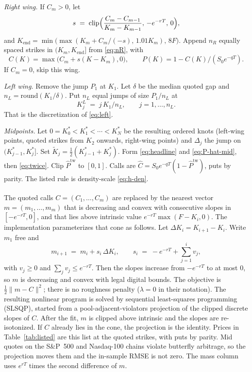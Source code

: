\documentclass[preprint,12pt,authoryear,times]{elsarticle}
\begin{document}
\textit{Right wing.} If \(C_m>0\), let
\[
s
\;=\;
\mathrm{clip}\Bigl(\frac{C_m-C_{m-1}}{K_m-K_{m-1}},\,-e^{-rT},\,0\Bigr),
\]
and \(K_{\mathrm{end}}=\min\bigl(\max(K_m+C_m/(-s),\,1.01 K_m),\,8F\bigr)\). Append \(n_R\) equally spaced strikes in \((K_m,K_{\mathrm{end}}]\) from \eqref{eq:nR}, with
\[
C(K)=\max\bigl(C_m+s(K-K_m),0\bigr),
\qquad
P(K)=1-C(K)/(S_0e^{-qT}).
\]
If \(C_m=0\), skip this wing.

\textit{Left wing.} Remove the jump \(P_1\) at \(K_1\). Let \(\delta\) be the median quoted gap and \(n_L=\mathrm{round}(K_1/\delta)\). Put \(n_L\) equal jumps of size \(P_1/n_L\) at
\[
K_j^{L}
\;=\;
j\,K_1/n_L,
\qquad
j=1,\ldots,n_L.
\]
That is the discretization of \eqref{eq:left}.

\textit{Midpoints.} Let \(0=K_0^{\ast}<K_1^{\ast}<\cdots<K_N^{\ast}\) be the resulting ordered knots (left-wing points, quoted strikes from \(K_2\) onwards, right-wing points) and \(\Delta_j\) the jump on \((K_{j-1}^{\ast},K_j^{\ast}]\). Set \(\tilde K_j=\tfrac12(K_{j-1}^{\ast}+K_j^{\ast})\). Form \eqref{eq:headline} and \eqref{eq:P-hat-mid}, then \eqref{eq:twice}. Clip \(\hat P^{\mathrm{tw}}\) to \([0,1]\). Calls are \(\hat C=S_0e^{-qT}(1-\hat P^{\mathrm{tw}})\), puts by parity. The listed rule is density-scale \eqref{eq:h-den}. 

\paragraph{\citeauthor{yatchew2006}}
The quoted calls \(C=(C_1,\ldots,C_m)\) are replaced by the nearest vector \(m=(m_1,\ldots,m_m)\) that is decreasing and convex with consecutive slopes in \([-e^{-rT},0]\), and that lies above intrinsic value \(e^{-rT}\max(F-K_i,0)\). The implementation parameterizes that cone as follows. Let \(\Delta K_i=K_{i+1}-K_i\). Write \(m_1\) free and
\[
m_{i+1}
\;=\;
m_i+s_i\,\Delta K_i,
\qquad
s_i
\;=\;
-e^{-rT}+\sum_{j=1}^{i}v_j,
\]
with \(v_j\ge 0\) and \(\sum_j v_j\le e^{-rT}\). Then the slopes increase from \(-e^{-rT}\) to at most \(0\), so \(m\) is decreasing and convex with legal digital bounds. The objective is \(\tfrac12\|m-C\|^2\); there is no roughness penalty (\(\lambda=0\) in their notation). The resulting nonlinear program is solved by sequential least-squares programming (SLSQP), started from a pool-adjacent-violators projection of the clipped discrete slopes of \(C\). After the fit, \(m\) is clipped above intrinsic and the slopes are re-isotonized. If \(C\) already lies in the cone, the projection is the identity. Prices in Table~\ref{tab:listed} are this list at the quoted strikes, with puts by parity. Mid quotes on the S\&P~500 and Nasdaq-100 chains violate butterfly arbitrage, so the projection moves them and the in-sample RMSE is not zero. The mass column uses \(e^{rT}\) times the second difference of \(m\).
\end{document}
